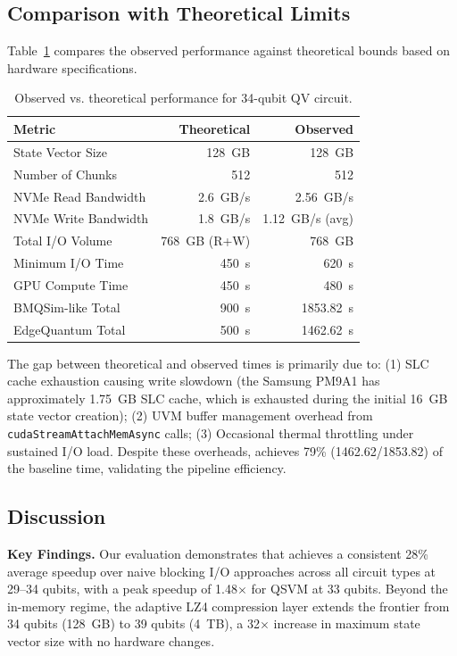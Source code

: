 \subsection{Comparison with Theoretical Limits}
\label{sec:theoretical}

Table~\ref{tab:theoretical} compares the observed performance against theoretical bounds based on hardware specifications.

\begin{table}[t]
\centering
\caption{Observed vs. theoretical performance for 34-qubit QV circuit.}
\begin{tabular}{|l|r|r|}
\hline
\textbf{Metric} & \textbf{Theoretical} & \textbf{Observed} \\
\hline
State Vector Size & 128~GB & 128~GB \\
Number of Chunks & 512 & 512 \\
NVMe Read Bandwidth & 2.6~GB/s & 2.56~GB/s \\
NVMe Write Bandwidth & 1.8~GB/s & 1.12~GB/s (avg) \\
Total I/O Volume & 768~GB (R+W) & 768~GB \\
Minimum I/O Time & 450~s & 620~s \\
GPU Compute Time & 450~s & 480~s \\
\hline
BMQSim-like Total & 900~s & 1853.82~s \\
EdgeQuantum Total & 500~s & 1462.62~s \\
\hline
\end{tabular}
\label{tab:theoretical}
\end{table}

The gap between theoretical and observed times is primarily due to:
(1) SLC cache exhaustion causing write slowdown (the Samsung PM9A1 has approximately 1.75~GB SLC cache, which is exhausted during the initial 16~GB state vector creation);
(2) UVM buffer management overhead from \texttt{cudaStreamAttachMemAsync} calls;
(3) Occasional thermal throttling under sustained I/O load.
Despite these overheads, \EdgeQuantum achieves 79\% (1462.62/1853.82) of the baseline time, validating the pipeline efficiency.



\subsection{Discussion}
\label{sec:discussion}

\noindent\textbf{Key Findings.}
Our evaluation demonstrates that \EdgeQuantum achieves a consistent 28\% average speedup over naive blocking I/O approaches across all circuit types at 29--34 qubits, with a peak speedup of 1.48$\times$ for QSVM at 33 qubits.
Beyond the in-memory regime, the adaptive LZ4 compression layer extends the frontier from 34 qubits (128~GB) to 39 qubits (4~TB), a 32$\times$ increase in maximum state vector size with no hardware changes.

